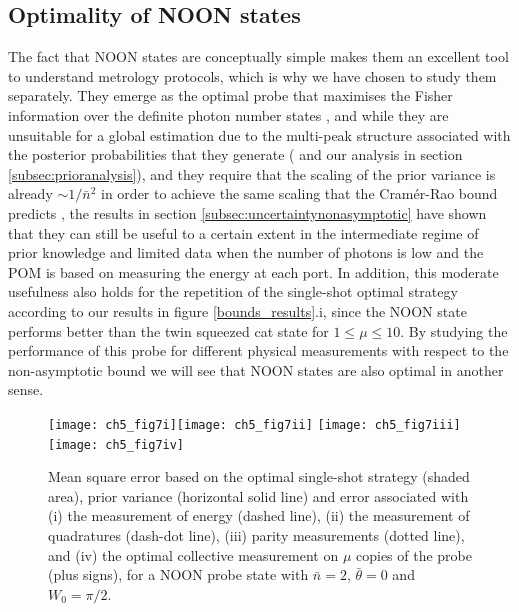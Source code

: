 \subsection{Optimality of NOON states}
\label{subsec:optnoon}

The fact that NOON states are conceptually simple makes them an excellent tool to understand metrology protocols, which is why we have chosen to study them separately. They emerge as the optimal probe that maximises the Fisher information over the definite photon number states \cite{demkowicz2011, jarzyna2016thesis}, and while they are unsuitable for a global estimation due to the multi-peak structure associated with the posterior probabilities that they generate (\cite{jarzyna2016thesis, kolodynski2014} and our analysis in section \ref{subsec:prioranalysis}), and they require that the scaling of the prior variance is already $\sim 1/\bar{n}^2$ in order to achieve the same scaling that the Cram\'{e}r-Rao bound predicts \cite{berry2012infinite, hall2012}, the results in section \ref{subsec:uncertaintynonasymptotic} have shown that they can still be useful to a certain extent in the intermediate regime of prior knowledge and limited data when the number of photons is low and the POM is based on measuring the energy at each port. In addition, this moderate usefulness also holds for the repetition of the single-shot optimal strategy according to our results in figure \ref{bounds_results}.i, since the NOON state performs better than the twin squeezed cat state for $1\leqslant\mu\leqslant10$. By studying the performance of this probe for different physical measurements with respect to the non-asymptotic bound we will see that NOON states are also optimal in another sense. 

\FloatBarrier

\begin{figure}[t]
\centering
\texttt{[image: ch5\_fig7i]}\texttt{[image: ch5\_fig7ii]}
\texttt{[image: ch5\_fig7iii]}\texttt{[image: ch5\_fig7iv]}
	\caption[Performance of different POMs with a NOON probe state]{Mean square error based on the optimal single-shot strategy (shaded area), prior variance (horizontal solid line) and error associated with (i) the measurement of energy (dashed line), (ii) the measurement of quadratures (dash-dot line), (iii) parity measurements (dotted line), and (iv) the optimal collective measurement on $\mu$ copies of the probe (plus signs), for a NOON probe state with $\bar{n}=2$, $\bar{\theta} = 0$ and $W_0 = \pi/2$.}
\label{noonPOM}
\end{figure}

